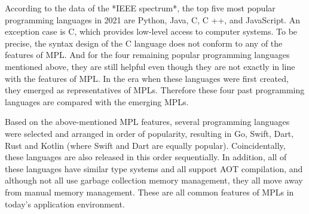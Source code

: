 According to the data of the *IEEE spectrum*, the top five most popular programming languages in 2021 are Python, Java, C, C ++, and JavaScript. An exception case is C, which provides low-level access to computer systems. To be precise, the syntax design of the C language does not conform to any of the features of MPL. And for the four remaining popular programming languages mentioned above, they are still helpful even though they are not exactly in line with the features of MPL. In the era when these languages were first created, they emerged as representatives of MPLs. Therefore these four past programming languages are compared with the emerging MPLs.

Based on the above-mentioned MPL features, several programming languages were selected and arranged in order of popularity, resulting in Go, Swift, Dart, Rust and Kotlin (where Swift and Dart are equally popular). Coincidentally, these languages are also released in this order sequentially. In addition, all of these languages have similar type systems and all support AOT compilation, and although not all use garbage collection memory management, they all move away from manual memory management. These are all common features of MPLs in today's application environment.

